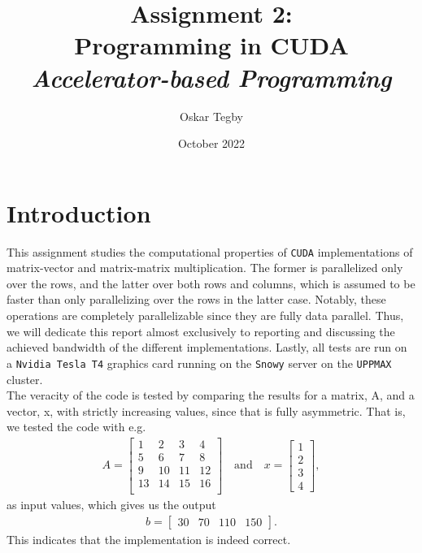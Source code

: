 \documentclass[10pt]{article}
\title{Assignment 2: \\ Programming in CUDA \\ \large \textit{Accelerator-based Programming}}
\author{Oskar Tegby}
\date{October 2022}
\begin{document}
\maketitle


\section{Introduction}
This assignment studies the computational properties of \texttt{CUDA} implementations of matrix-vector and matrix-matrix multiplication. The former is parallelized only over the rows, and the latter over both rows and columns, which is assumed to be faster than only parallelizing over the rows in the latter case. Notably, these operations are completely parallelizable since they are fully data parallel. Thus, we will dedicate this report almost exclusively to reporting and discussing the achieved bandwidth of the different implementations. Lastly, all tests are run on a \texttt{Nvidia Tesla T4} graphics card running on the \texttt{Snowy} server on the \texttt{UPPMAX} cluster. \\

The veracity of the code is tested by comparing the results for a matrix, A, and a vector, x, with strictly increasing values, since that is fully asymmetric. That is, we tested the code with e.g.
\begin{align*}
    A=
    \begin{bmatrix}
        1 & 2 & 3 & 4 \\
        5 & 6 & 7 & 8 \\
        9 & 10 & 11 & 12 \\
        13 & 14 & 15 & 16 \\
    \end{bmatrix}
    \quad\text{and}\quad
    x=
    \begin{bmatrix}
        1 \\
        2 \\
        3 \\
        4
    \end{bmatrix},
\end{align*}
as input values, which gives us the output
\begin{align*}
    b=
    \begin{bmatrix}
        30 & 70 & 110 & 150
    \end{bmatrix}.
\end{align*}
This indicates that the implementation is indeed correct.
\end{document}
